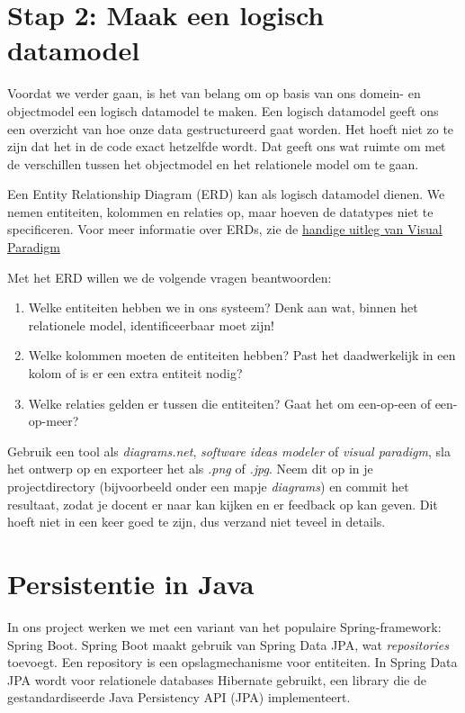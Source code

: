 \section{Stap 2: Maak een logisch datamodel}
Voordat we verder gaan, is het van belang om op basis van 
ons domein- en objectmodel een logisch datamodel te maken. 
Een logisch datamodel geeft ons een overzicht van hoe onze 
data gestructureerd gaat worden. Het hoeft niet zo te zijn 
dat het in de code exact hetzelfde wordt. Dat geeft ons wat 
ruimte om met de verschillen tussen het objectmodel en het 
relationele model om te gaan.

Een Entity Relationship Diagram (ERD) kan als logisch datamodel dienen.
We nemen entiteiten, kolommen en relaties op, 
maar hoeven de datatypes niet te specificeren.
Voor meer informatie over ERDs, zie de 
\href{https://www.visual-paradigm.com/guide/data-modeling/what-is-entity-relationship-diagram/#erd-data-models-conceptual}{handige uitleg van Visual Paradigm}

Met het ERD willen we de volgende vragen beantwoorden:
\begin{enumerate}
    \item Welke entiteiten hebben we in ons systeem? 
    Denk aan wat, binnen het relationele model, identificeerbaar moet zijn!
    \item Welke kolommen moeten de entiteiten hebben?
    Past het daadwerkelijk in een kolom of is er een extra entiteit nodig?
    \item Welke relaties gelden er tussen die entiteiten?
    Gaat het om een-op-een of een-op-meer?
\end{enumerate}

Gebruik een tool als \textit{diagrams.net}, \textit{software ideas modeler} of \textit{visual paradigm},
sla het ontwerp op en exporteer het als \textit{.png} of \textit{.jpg}. 
Neem dit op in je projectdirectory (bijvoorbeeld onder een mapje \textit{diagrams})
en commit het resultaat, zodat je docent er naar kan kijken en er feedback op kan geven.
Dit hoeft niet in een keer goed te zijn, dus verzand niet teveel in details.

\section{Persistentie in Java}
In ons project werken we met een variant van het populaire Spring-framework:
Spring Boot. Spring Boot maakt gebruik van Spring Data JPA, wat \textit{repositories} toevoegt.
Een repository is een opslagmechanisme voor entiteiten. In Spring Data JPA wordt 
voor relationele databases Hibernate gebruikt, een library die de 
gestandardiseerde Java Persistency API (JPA) implementeert.

